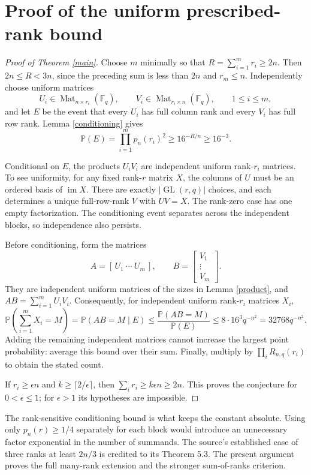 \documentclass[11pt]{article}
\newcommand{\Mat}{\operatorname{Mat}}
\newcommand{\GL}{\operatorname{GL}}
\begin{document}
\section*{Proof of the uniform prescribed-rank bound}
\begin{proof}[Proof of Theorem \ref{main}]
Choose $m$ minimally so that $R=\sum_{i=1}^m r_i\ge2n$.
Then $2n\le R<3n$, since the preceding sum is less than $2n$ and
$r_m\le n$.
Independently choose uniform matrices
\[
 U_i\in\Mat_{n\times r_i}(\mathbb F_q),\qquad
 V_i\in\Mat_{r_i\times n}(\mathbb F_q),\qquad 1\le i\le m,
\]
and let $E$ be the event that every $U_i$ has full column rank and
every $V_i$ has full row rank. Lemma \ref{conditioning} gives
\[
 \mathbb P(E)=\prod_{i=1}^m p_n(r_i)^2
 \ge16^{-R/n}\ge16^{-3}.
\]

Conditional on $E$, the products $U_iV_i$ are independent uniform
rank-$r_i$ matrices. To see uniformity, for any fixed rank-$r$ matrix $X$,
the columns of $U$ must be an ordered basis of $\operatorname{im}X$.
There are exactly $|\GL(r,q)|$ choices, and each determines a unique
full-row-rank $V$ with $UV=X$. The rank-zero case has one empty
factorization. The conditioning event separates across the independent
blocks, so independence also persists.

Before conditioning, form the matrices
\[
 A=[\,U_1\ \cdots\ U_m\,],\qquad
 B=\begin{bmatrix}V_1\\ \vdots\\ V_m\end{bmatrix}.
\]
They are independent uniform matrices of the sizes in Lemma \ref{product},
and $AB=\sum_{i=1}^m U_iV_i$. Consequently, for independent uniform
rank-$r_i$ matrices $X_i$,
\[
 \mathbb P\left(\sum_{i=1}^mX_i=M\right)
 =\mathbb P(AB=M\mid E)
 \le\frac{\mathbb P(AB=M)}{\mathbb P(E)}
 \le8\cdot16^3q^{-n^2}=32768q^{-n^2}.
\]
Adding the remaining independent matrices cannot increase the largest
point probability: average this bound over their sum. Finally, multiply
by $\prod_iR_{n,q}(r_i)$ to obtain the stated count.

If $r_i\ge\epsilon n$ and $k\ge\lceil2/\epsilon\rceil$, then
$\sum_i r_i\ge k\epsilon n\ge2n$. This proves the conjecture for
$0<\epsilon\le1$; for $\epsilon>1$ its hypotheses are impossible.
\end{proof}

The rank-sensitive conditioning bound is what keeps the constant absolute.
Using only $p_n(r)\ge1/4$ separately for each block would introduce an
unnecessary factor exponential in the number of summands.
The source's established case of three ranks at least $2n/3$
is credited to its Theorem 5.3. The present argument proves the full
many-rank extension and the stronger sum-of-ranks criterion.
\end{document}
